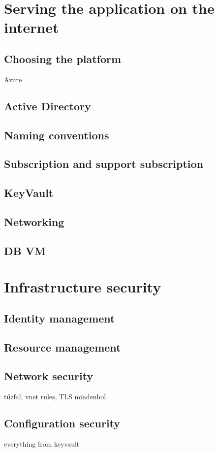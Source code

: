\section{Serving the application on the internet}

\subsection{Choosing the platform}
Azure
\subsection{Active Directory}
\subsection{Naming conventions}
\subsection{Subscription and support subscription}
\subsection{KeyVault}
\subsection{Networking}
\subsection{DB VM}

\section{Infrastructure security}
\subsection{Identity management}
\subsection{Resource management}
\subsection{Network security}
tűzfal, vnet rules, TLS mindenhol

\subsection{Configuration security}
everything from keyvault
